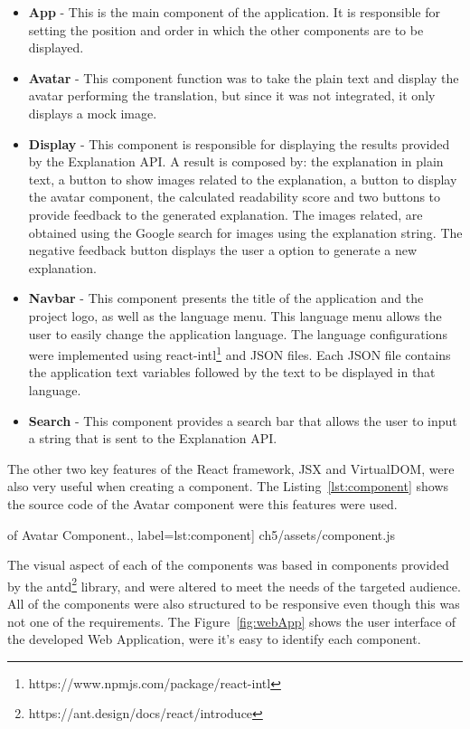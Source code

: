 \begin{itemize}
    \item \textbf{App} - This is the main component of the application.
        It is responsible for setting the position and order in which the other components are to be displayed.
    \item \textbf{Avatar} - This component function was to take the plain text and display the avatar performing the translation, but since it was not integrated, it only displays a mock image.
    \item \textbf{Display} - This component is responsible for displaying the results provided by the Explanation API.
        A result is composed by: the explanation in plain text, a button to show images related to the explanation, a button to display the avatar component, the calculated readability score and two buttons to provide feedback to the generated explanation.
        The images related, are obtained using the Google search for images using the explanation string.
        The negative feedback button displays the user a option to generate a new explanation.
    \item \textbf{Navbar} - This component presents the title of the application and the project logo, as well as the language menu.
        This language menu allows the user to easily change the application language.
        The language configurations were implemented using react-intl\footnote{https://www.npmjs.com/package/react-intl} and JSON files.
        Each JSON file contains the application text variables followed by the text to be displayed in that language.
    \item \textbf{Search} - This component provides a search bar that allows the user to input a string that is sent to the Explanation API.
\end{itemize}

The other two key features of the React framework, JSX and VirtualDOM, were also very useful when creating a component.
The Listing~\ref{lst:component} shows the source code of the Avatar component were this features were used.

\begin{center}
\begin{minipage}{0.95\linewidth}
 of Avatar Component.,
label=lst:component]
{ch5/assets/component.js}
\end{minipage}
\end{center}

The visual aspect of each of the components was based in components provided by the antd\footnote{https://ant.design/docs/react/introduce} library, and were altered to meet the needs of the targeted audience.
All of the components were also structured to be responsive even though this was not one of the requirements.
The Figure~\ref{fig:webApp} shows the user interface of the developed Web Application, were it's easy to identify each component.

